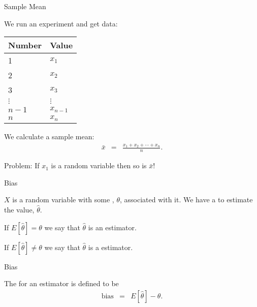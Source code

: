 \begin{frame}{Sample Mean}

  We run an experiment and get data: \\
    \begin{tabular}{l|l}
      Number  & Value \\ \hline
      1 & $x_1$ \\
      2 & $x_2$ \\
      3 & $x_3$ \\
      $\vdots$ & $\vdots$ \\
      $n-1$ & $x_{n-1}$ \\
      $n$ & $x_n$
    \end{tabular}

  {
    We calculate a sample mean:
    \begin{eqnarray*}
      \bar{x} & = & \frac{x_1+x_2+\cdots+x_n}{n}.
    \end{eqnarray*}
  }

  {
    Problem: If $x_1$ is a random variable then so is $\bar{x}$!
  }

  
\end{frame}


\begin{frame}{Bias}

  $X$ is a random variable with some , $\theta$,
  associated with it. We have a  to estimate the
  value, $\hat{\theta}$. 

  \begin{definition}
    If $E[\hat{\theta}]=\theta$ we say that $\hat{\theta}$ is an
     estimator.
  \end{definition}

  \begin{definition}
    If $E[\hat{\theta}]\neq\theta$ we say that $\hat{\theta}$ is a
     estimator.
  \end{definition}
  
\end{frame}




\begin{frame}{Bias}

  \begin{definition}[bias]
    The  for an estimator is defined to be
    \begin{eqnarray*}
      \mathrm{bias} & = & E[\hat{\theta}] - \theta.
    \end{eqnarray*}

  \end{definition}
  
\end{frame}


